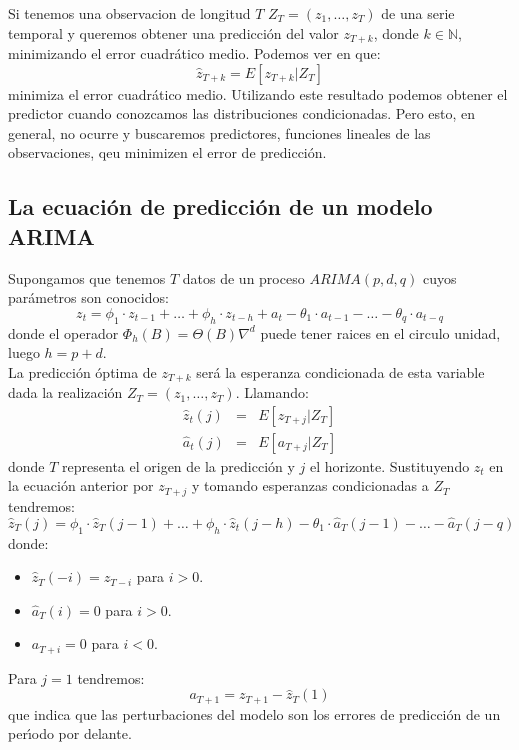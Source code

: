 Si tenemos una observacion de longitud $T$ $Z_T=(z_1,\dots,z_T)$ de una serie
temporal y queremos obtener una predicci\'on del valor $z_{T+k}$, donde
$k\in \mathbb{N}$, minimizando el error cuadr\'atico medio. Podemos ver en
\cite{Daniel} que:
\begin{displaymath}
\hat{z}_{T+k}=E[z_{T+k} | Z_T]
\end{displaymath}
minimiza el error cuadr\'atico medio. Utilizando este resultado podemos obtener
el predictor cuando conozcamos las distribuciones condicionadas. Pero esto, en
general, no ocurre y buscaremos predictores, funciones lineales de las
observaciones, qeu minimizen el error de predicci\'on.
%
\newpage
%
\subsection{La ecuaci\'on de predicci\'on de un modelo ARIMA}

Supongamos que tenemos $T$ datos de un proceso $ARIMA(p,d,q)$ cuyos par\'ametros
son conocidos:
\begin{displaymath}
z_t=\phi_1\cdot z_{t-1}+\dots+\phi_h\cdot z_{t-h}+a_t-\theta_1\cdot a_{t-1}-
\dots - \theta_q\cdot a_{t-q}
\end{displaymath}
donde el operador $\Phi_h(B)=\Theta (B)\nabla^d$ puede tener raices en el
circulo unidad, luego $h=p+d$.\\

La predicci\'on \'optima de $z_{T+k}$ ser\'a la esperanza condicionada de esta
variable dada la realizaci\'on $Z_T=(z_1,\dots,z_T)$. Llamando:
\begin{eqnarray*}
\hat{z}_t(j)&=&E[z_{T+j} | Z_T]\\
\hat{a}_t(j)&=&E[a_{T+j} | Z_T]
\end{eqnarray*}
donde $T$ representa el origen de la predicci\'on y $j$ el horizonte.
Sustituyendo $z_t$ en la ecuaci\'on anterior por $z_{T+j}$ y tomando esperanzas
condicionadas a $Z_T$ tendremos:
\begin{equation}\label{eq:Esperanzas}
\hat{z}_T(j)=\phi_1\cdot \hat{z}_T(j-1)+\dots+\phi_h\cdot \hat{z}_t(j-h)-
\theta_1\cdot \hat{a}_T(j-1)-\dots-\hat{a}_T(j-q)
\end{equation}
donde:
\begin{itemize}
\item $\hat{z}_T(-i)=z_{T-i}$ para $i>0$.
\item $\hat{a}_T(i)=0$ para $i>0$.
\item $a_{T+i}=0$ para $i<0$.
\end{itemize}
Para $j=1$ tendremos:
\begin{displaymath}
a_{T+1}=z_{T+1}-\hat{z}_T(1)
\end{displaymath}
que indica que las perturbaciones del modelo son los errores de predicci\'on
de un per\'{\i}odo por delante.\\

